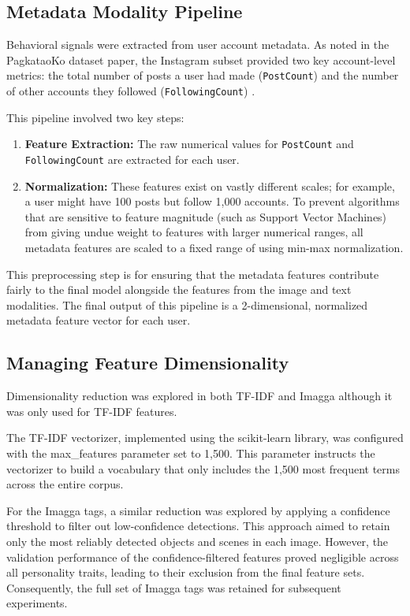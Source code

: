\subsection{Metadata Modality Pipeline}
Behavioral signals were extracted from user account metadata. As noted in the PagkataoKo dataset paper, the Instagram subset provided two key account-level metrics: the total number of posts a user had made (\texttt{PostCount}) and the number of other accounts they followed (\texttt{FollowingCount}) \citep{tighe_acorda_2022}.

This pipeline involved two key steps:
\begin{enumerate}
	\item \textbf{Feature Extraction:} The raw numerical values for \texttt{PostCount} and \texttt{FollowingCount} are extracted for each user.
	\item \textbf{Normalization:} These features exist on vastly different scales; for example, a user might have 100 posts but follow 1,000 accounts. To prevent algorithms that are sensitive to feature magnitude (such as Support Vector Machines) from giving undue weight to features with larger numerical ranges, all metadata features are scaled to a fixed range of  using min-max normalization.
\end{enumerate}
This preprocessing step is for ensuring that the metadata features contribute fairly to the final model alongside the features from the image and text modalities. The final output of this pipeline is a 2-dimensional, normalized metadata feature vector for each user.

\subsection{Managing Feature Dimensionality}
Dimensionality reduction was explored in both TF-IDF and Imagga although it was only used for TF-IDF features. 

The TF-IDF vectorizer, implemented using the scikit-learn library, was configured with the max\_features parameter set to 1,500. This parameter instructs the vectorizer to build a vocabulary that only includes the 1,500 most frequent terms across the entire corpus.

For the Imagga tags, a similar reduction was explored by applying a confidence threshold to filter out low-confidence detections. This approach aimed to retain only the most reliably detected objects and scenes in each image. However, the validation performance of the confidence-filtered features proved negligible across all personality traits, leading to their exclusion from the final feature sets. Consequently, the full set of Imagga tags was retained for subsequent experiments.


